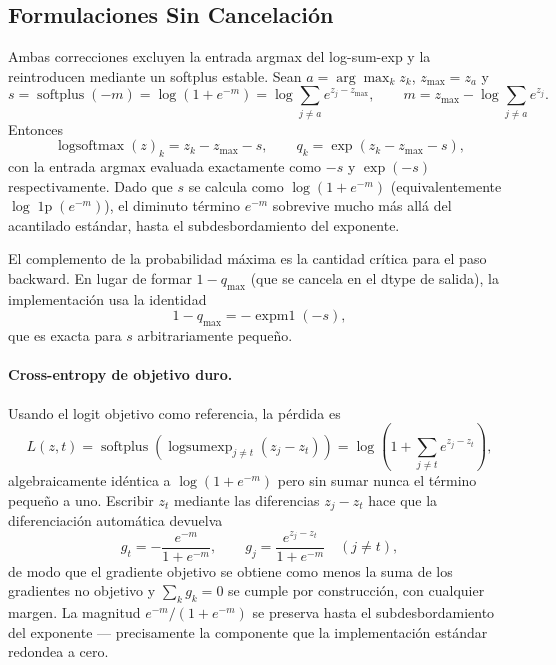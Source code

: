 \subsection{Formulaciones Sin Cancelación}
\label{sec:fixed-formulations}

Ambas correcciones excluyen la entrada argmax del log-sum-exp y la reintroducen mediante un softplus estable. Sean $a = \arg\max_k z_k$, $z_{\max} = z_a$ y
\begin{equation}
s = \operatorname{softplus}\!\left(-m\right) = \log\!\left(1 + e^{-m}\right)
    = \log \sum_{j \neq a} e^{z_j - z_{\max}} ,
\qquad m = z_{\max} - \log \sum_{j \neq a} e^{z_j}.
\label{eq:softplus-margin}
\end{equation}
Entonces
\begin{equation}
\operatorname{logsoftmax}(z)_k = z_k - z_{\max} - s,
\qquad
q_k = \exp\!\left(z_k - z_{\max} - s\right),
\label{eq:fixed-values}
\end{equation}
con la entrada argmax evaluada exactamente como $-s$ y $\exp(-s)$ respectivamente. Dado que $s$ se calcula como $\log(1 + e^{-m})$ (equivalentemente $\log\!\operatorname{1p}(e^{-m})$), el diminuto término $e^{-m}$ sobrevive mucho más allá del acantilado estándar, hasta el subdesbordamiento del exponente.

El complemento de la probabilidad máxima es la cantidad crítica para el paso backward. En lugar de formar $1 - q_{\max}$ (que se cancela en el dtype de salida), la implementación usa la identidad
\begin{equation}
1 - q_{\max} = -\operatorname{expm1}(-s),
\label{eq:one-minus-qmax}
\end{equation}
que es exacta para $s$ arbitrariamente pequeño.

\paragraph{Cross-entropy de objetivo duro.} Usando el logit objetivo como referencia, la pérdida es
\begin{equation}
L(z,t) = \operatorname{softplus}\!\left(\operatorname{logsumexp}_{j \neq t}\left(z_j - z_t\right)\right)
       = \log\!\left(1 + \sum_{j \neq t} e^{z_j - z_t}\right),
\label{eq:fixed-ce}
\end{equation}
algebraicamente idéntica a $\log(1 + e^{-m})$ pero sin sumar nunca el término pequeño a uno. Escribir $z_t$ mediante las diferencias $z_j - z_t$ hace que la diferenciación automática devuelva
\begin{equation}
g_t = -\frac{e^{-m}}{1 + e^{-m}}, \qquad
g_j = \frac{e^{z_j - z_t}}{1 + e^{-m}} \quad (j \neq t),
\label{eq:fixed-gradients}
\end{equation}
de modo que el gradiente objetivo se obtiene como menos la suma de los gradientes no objetivo y $\sum_k g_k = 0$ se cumple por construcción, con cualquier margen. La magnitud $e^{-m}/(1+e^{-m})$ se preserva hasta el subdesbordamiento del exponente --- precisamente la componente que la implementación estándar redondea a cero.

